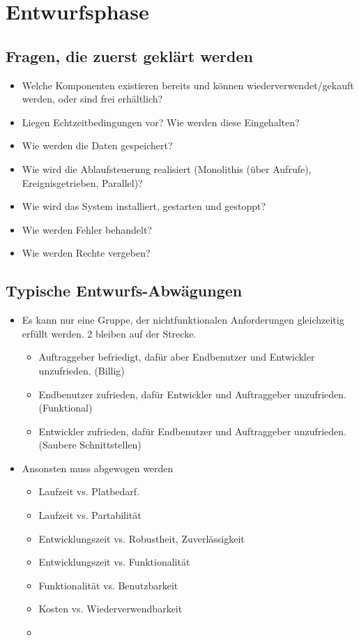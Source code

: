 \section{Entwurfsphase}
\subsection{Fragen, die zuerst geklärt werden}
\begin{itemize}
    \item Welche Komponenten existieren bereits und können wiederverwendet/gekauft werden, oder sind frei erhältlich?
    \item Liegen Echtzeitbedingungen vor? Wie werden diese Eingehalten?
    \item Wie werden die Daten gespeichert?
    \item Wie wird die Ablaufsteuerung realisiert (Monolithis (über Aufrufe), Ereignisgetrieben, Parallel)?
    \item Wie wird das System installiert, gestarten und gestoppt?
    \item Wie werden Fehler behandelt?
    \item Wie werden Rechte vergeben?
\end{itemize}

\subsection{Typische Entwurfs-Abwägungen}
\begin{itemize}
    \item Es kann nur eine Gruppe, der nichtfunktionalen Anforderungen gleichzeitig erfüllt werden. 2 bleiben auf der Strecke.
    \begin{itemize}
        \item Auftraggeber befriedigt, dafür aber Endbenutzer und Entwickler unzufrieden. (Billig)
        \item Endbenutzer zufrieden, dafür Entwickler und Auftraggeber unzufrieden. (Funktional)
        \item Entwickler zufrieden, dafür Endbenutzer und Auftraggeber unzufrieden. (Saubere Schnittstellen)
    \end{itemize}
    \item Ansonsten muss abgewogen werden
    \begin{itemize}
        \item Laufzeit vs. Platbedarf.
        \item Laufzeit vs. Partabilität
        \item Entwicklungszeit vs. Robustheit, Zuverlässigkeit
        \item Entwicklungszeit vs. Funktionalität
        \item Funktionalität vs. Benutzbarkeit
        \item Kosten vs. Wiederverwendbarkeit
        \item {}
    \end{itemize}
\end{itemize}

